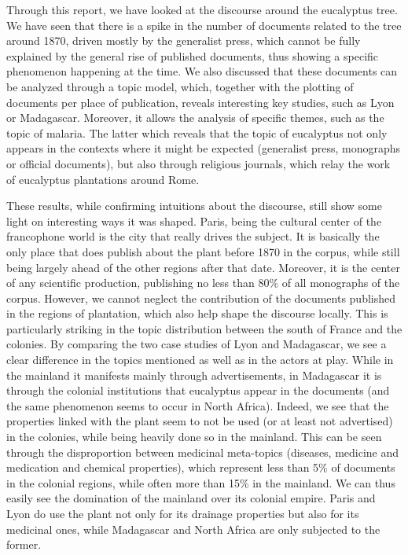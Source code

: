 

Through this report, we have looked at the discourse around the eucalyptus tree. We have seen that there is a spike in the number of documents related to the tree around 1870, driven mostly by the generalist press, which cannot be fully explained by the general rise of published documents, thus showing a specific phenomenon happening at the time. We also discussed that these documents can be analyzed through a topic model, which, together with the plotting of documents per place of publication, reveals interesting key studies, such as Lyon or Madagascar. Moreover, it allows the analysis of specific themes, such as the topic of malaria. The latter which reveals that the topic of eucalyptus not only appears in the contexts where it might be expected (generalist press, monographs or official documents), but also through religious journals, which relay the work of eucalyptus plantations around Rome.

These results, while confirming intuitions about the discourse, still show some light on interesting ways it was shaped. Paris, being the cultural center of the francophone world is the city that really drives the subject. It is basically the only place that does publish about the plant before 1870 in the corpus, while still being largely ahead of the other regions after that date. Moreover, it is the center of any scientific production, publishing no less than 80\% of all monographs of the corpus. However, we cannot neglect the contribution of the documents published in the regions of plantation, which also help shape the discourse locally. This is particularly striking in the topic distribution between the south of France and the colonies. By comparing the two case studies of Lyon and Madagascar, we see a clear difference in the topics mentioned as well as in the actors at play. While in the mainland it manifests mainly through advertisements, in Madagascar it is through the colonial institutions that eucalyptus appear in the documents (and the same phenomenon seems to occur in North Africa). Indeed, we see that the properties linked with the plant seem to not be used (or at least not advertised) in the colonies, while being heavily done so in the mainland. This can be seen through the disproportion between medicinal meta-topics (diseases, medicine and medication and chemical properties), which represent less than 5\% of documents in the colonial regions, while often more than 15\% in the mainland. We can thus easily see the
domination of the mainland over its colonial empire. Paris and Lyon do use the plant not only for its drainage properties but also for its medicinal ones, while Madagascar and North Africa are only subjected to the former. 

